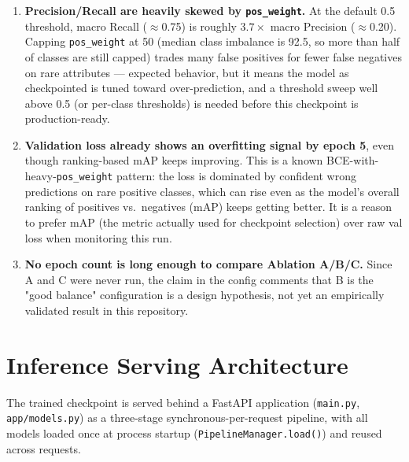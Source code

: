 \documentclass[11pt]{article}
\newcommand{\code}[1]{\texttt{\small #1}}
\begin{document}
\begin{enumerate}
\item \textbf{Precision/Recall are heavily skewed by \code{pos\_weight}.} At the default 0.5 threshold, macro Recall ($\approx$0.75) is roughly $3.7\times$ macro Precision ($\approx$0.20). Capping \code{pos\_weight} at 50 (median class imbalance is 92.5, so more than half of classes are still capped) trades many false positives for fewer false negatives on rare attributes --- expected behavior, but it means the model as checkpointed is tuned toward over-prediction, and a threshold sweep well above 0.5 (or per-class thresholds) is needed before this checkpoint is production-ready.
\item \textbf{Validation loss already shows an overfitting signal by epoch 5}, even though ranking-based mAP keeps improving. This is a known BCE-with-heavy-\code{pos\_weight} pattern: the loss is dominated by confident wrong predictions on rare positive classes, which can rise even as the model's overall ranking of positives vs.\ negatives (mAP) keeps getting better. It is a reason to prefer mAP (the metric actually used for checkpoint selection) over raw val loss when monitoring this run.
\item \textbf{No epoch count is long enough to compare Ablation A/B/C.} Since A and C were never run, the claim in the config comments that B is the "good balance" configuration is a design hypothesis, not yet an empirically validated result in this repository.
\end{enumerate}

\section{Inference Serving Architecture}

The trained checkpoint is served behind a FastAPI application (\code{main.py}, \code{app/models.py}) as a three-stage synchronous-per-request pipeline, with all models loaded once at process startup (\code{PipelineManager.load()}) and reused across requests.
\end{document}
